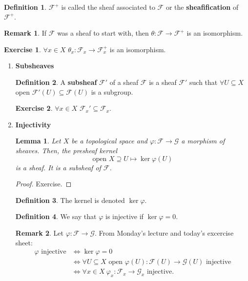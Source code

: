 \documentclass[12pt]{article}
\newtheorem*{lemma}{Lemma}
\theoremstyle{definition}
\newtheorem*{definition}{Definition}
\newtheorem*{remark}{Remark}
\newtheorem*{exercise}{Exercise}
\begin{document}
\begin{definition}
$\mathcal{F}^+$ is called the sheaf associated to $\mathcal{F}$ or the \textbf{sheafification} of $\mathcal{F}^+$.
\end{definition}

\begin{remark}
If $\mathcal{F}$ was a sheaf to start with, then $\theta:\mathcal{F}\rightarrow\mathcal{F}^+$ is an isomorphism.
\end{remark}

\begin{exercise}
$\forall x\in X$ $\theta_x:\mathcal{F}_x\rightarrow\mathcal{F}^+_x$ is an isomorphism.
\end{exercise}

\begin{enumerate}[label=\arabic*)]
\item \textbf{Subsheaves}
\begin{definition}
A \textbf{subsheaf} $\mathcal{F}'$ of a sheaf $\mathcal{F}$ is a sheaf $\mathcal{F}'$ such that $\forall U\subseteq X$ open $\mathcal{F}'(U)\subseteq\mathcal{F}(U)$ is a subgroup.
\end{definition}

\begin{exercise}
$\forall x\in X$ $\mathcal{F}_x'\subseteq\mathcal{F}_x$.
\end{exercise}

\item \textbf{Injectivity}
\begin{lemma}
Let $X$ be a topological space and $\varphi:\mathcal{F}\rightarrow\mathcal{G}$ a morphism of sheaves. Then, the presheaf kernel
\[\text{open }X\supseteq U\longmapsto\ker\varphi(U)\]
is a sheaf. It is a subsheaf of $\mathcal{F}$.
\end{lemma}

\begin{proof}
Exercise.
\end{proof}

\begin{definition}
The kernel is denoted $\ker\varphi$.
\end{definition}

\begin{definition}
We say that $\varphi$ is injective if $\ker\varphi=0$.
\end{definition}

\begin{remark}
Let $\varphi:\mathcal{F}\rightarrow\mathcal{G}$. From Monday's lecture and today's excercise sheet:
\begin{align*}
\varphi\text{ injective}&\Longleftrightarrow\ker\varphi=0\\
&\Longleftrightarrow\forall U\subseteq X\text{ open }\varphi(U):\mathcal{F}(U)\rightarrow\mathcal{G}(U)\text{ injective}\\
&\Longleftrightarrow\forall x\in X\ \varphi_x:\mathcal{F}_x\rightarrow\mathcal{G}_x\text{ injective}.
\end{align*}
\end{remark}


\end{enumerate}
\end{document}
